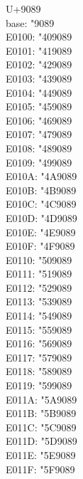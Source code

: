 \documentclass{ujarticle}
\begin{document}
\begin{multicols*}{4}
\newcolumn
U+9089\\
base: \kchar"9089\\
E0100: \kchar"409089\\
E0101: \kchar"419089\\
E0102: \kchar"429089\\
E0103: \kchar"439089\\
E0104: \kchar"449089\\
E0105: \kchar"459089\\
E0106: \kchar"469089\\
E0107: \kchar"479089\\
E0108: \kchar"489089\\
E0109: \kchar"499089\\
E010A: \kchar"4A9089\\
E010B: \kchar"4B9089\\
E010C: \kchar"4C9089\\
E010D: \kchar"4D9089\\
E010E: \kchar"4E9089\\
E010F: \kchar"4F9089\\
E0110: \kchar"509089\\
E0111: \kchar"519089\\
E0112: \kchar"529089\\
E0113: \kchar"539089\\
E0114: \kchar"549089\\
E0115: \kchar"559089\\
E0116: \kchar"569089\\
E0117: \kchar"579089\\
E0118: \kchar"589089\\
E0119: \kchar"599089\\
E011A: \kchar"5A9089\\
E011B: \kchar"5B9089\\
E011C: \kchar"5C9089\\
E011D: \kchar"5D9089\\
E011E: \kchar"5E9089\\
E011F: \kchar"5F9089\\


\end{multicols*}
\end{document}
